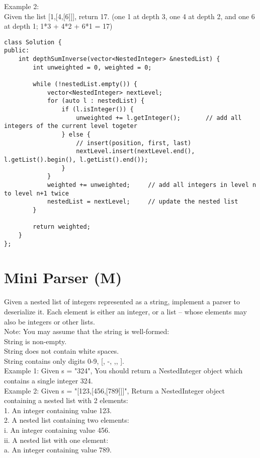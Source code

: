 Example 2:\\
Given the list [1,[4,[6]]], return 17. (one 1 at depth 3, one 4 at depth 2, and one 6 at depth 1; 1*3 + 4*2 + 6*1 = 17)  \\

\begin{lstlisting}
class Solution {
public:
    int depthSumInverse(vector<NestedInteger> &nestedList) {
        int unweighted = 0, weighted = 0;
        
        while (!nestedList.empty()) {
            vector<NestedInteger> nextLevel;
            for (auto l : nestedList) {
                if (l.isInteger()) {
                    unweighted += l.getInteger();       // add all integers of the current level togeter
                } else {
                    // insert(position, first, last)
                    nextLevel.insert(nextLevel.end(), l.getList().begin(), l.getList().end());
                }
            }
            weighted += unweighted;     // add all integers in level n to level n+1 twice
            nestedList = nextLevel;     // update the nested list
        }
        
        return weighted;
    }
};
\end{lstlisting}


\section{Mini Parser (M)}
Given a nested list of integers represented as a string, implement a parser to deserialize it. Each element is either an integer, or a list -- whose elements may also be integers or other lists.\\

Note: You may assume that the string is well-formed:\\
    String is non-empty.\\
    String does not contain white spaces.\\
    String contains only digits 0-9, [, -, ,, ].\\

Example 1:
Given s = "324",
You should return a NestedInteger object which contains a single integer 324.\\

Example 2:
Given s = "[123,[456,[789]]]",
Return a NestedInteger object containing a nested list with 2 elements:\\
1. An integer containing value 123.\\
2. A nested list containing two elements:\\
    i.  An integer containing value 456.\\
    ii. A nested list with one element:\\
         a. An integer containing value 789.\\

